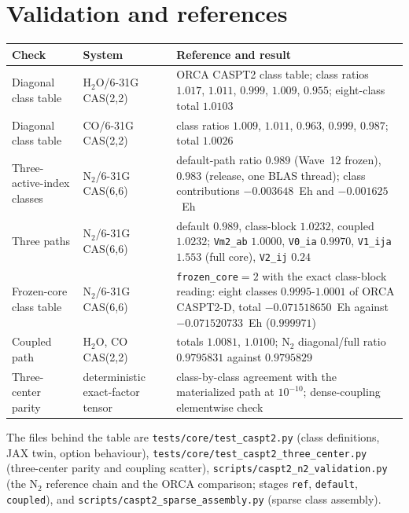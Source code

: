 \section{Validation and references}
\label{sec:caspt2-validation}

\begin{center}
\small
\begin{tabularx}{\textwidth}{>{\raggedright\arraybackslash}p{}>{\raggedright\arraybackslash}p{}X}
\toprule
Check & System & Reference and result \\
\midrule
Diagonal class table &
  H$_2$O/6-31G CAS(2,2) &
  ORCA CASPT2 class table; class ratios $1.017$, $1.011$, $0.999$,
  $1.009$, $0.955$; eight-class total $1.0103$ \\
Diagonal class table &
  CO/6-31G CAS(2,2) &
  class ratios $1.009$, $1.011$, $0.963$, $0.999$, $0.987$; total
  $1.0026$ \\
Three-active-index classes &
  N$_2$/6-31G CAS(6,6) &
  default-path ratio $0.989$ (Wave~12 frozen), $0.983$ (release, one
  BLAS thread); class contributions $-0.003648$~Eh and
  $-0.001625$~Eh \\
Three paths &
  N$_2$/6-31G CAS(6,6) &
  default $0.989$, class-block $1.0232$, coupled $1.0232$;
  \texttt{Vm2\_ab} $1.0000$, \texttt{V0\_ia} $0.9970$,
  \texttt{V1\_ija} $1.553$ (full core), \texttt{V2\_ij} $0.24$ \\
Frozen-core class table &
  N$_2$/6-31G CAS(6,6) &
  \texttt{frozen\_core}$=2$ with the exact class-block reading: eight
  classes $0.9995$-$1.0001$ of ORCA CASPT2-D, total $-0.071518650$~Eh
  against $-0.071520733$~Eh ($0.999971$) \\
Coupled path &
  H$_2$O, CO CAS(2,2) &
  totals $1.0081$, $1.0100$; N$_2$ diagonal/full ratio $0.9795831$
  against $0.9795829$ \\
Three-center parity &
  deterministic exact-factor tensor &
  class-by-class agreement with the materialized path at $10^{-10}$;
  dense-coupling elementwise check \\
\bottomrule
\end{tabularx}
\end{center}

The files behind the table are
\texttt{tests/core/test\_caspt2.py} (class definitions, JAX twin,
option behaviour), \texttt{tests/core/test\_caspt2\_three\_center.py}
(three-center parity and coupling scatter),
\texttt{scripts/caspt2\_n2\_validation.py} (the N$_2$ reference chain
and the ORCA comparison; stages \texttt{ref}, \texttt{default},
\texttt{coupled}), and \texttt{scripts/caspt2\_sparse\_assembly.py}
(sparse class assembly).


